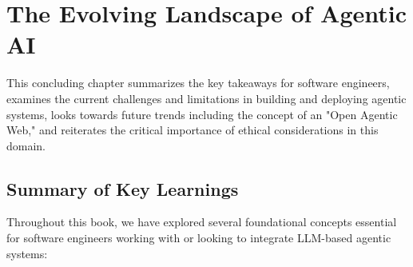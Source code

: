 \chapter{The Evolving Landscape of Agentic AI}

This concluding chapter summarizes the key takeaways for software engineers, examines the current challenges and limitations in building and deploying agentic systems, 
looks towards future trends including the concept of an "Open Agentic Web," and reiterates the critical importance of ethical considerations in this domain.

\section{Summary of Key Learnings}

Throughout this book, we have explored several foundational concepts essential for software engineers working with or looking to 
integrate LLM-based agentic systems:

